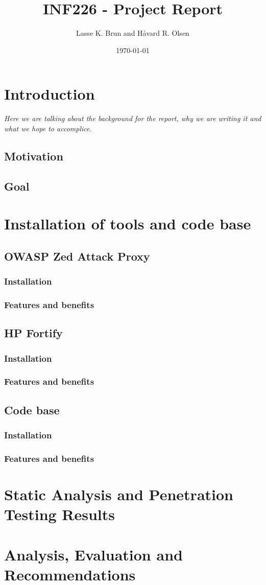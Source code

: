 \documentclass[11pt,english,a4paper]{report}
\title{INF226 - Project Report}
\date{\today}
\author{Lasse K. Brun and Håvard R. Olsen}
\begin{document}
\maketitle


\chapter{Introduction}
\textit{Here we are talking about the background for the report, why we are writing it and what we hope to accomplice.}

\section{Motivation}

\section{Goal}
\chapter{Installation of tools and code base}
\section{OWASP Zed Attack Proxy}
\subsection{Installation}
\subsection{Features and benefits}
\section{HP Fortify}
\subsection{Installation}
\subsection{Features and benefits}
\section{Code base}
\subsection{Installation}
\subsection{Features and benefits}

\chapter{Static Analysis and Penetration Testing Results}
\chapter{Analysis, Evaluation and Recommendations}
\end{document}
